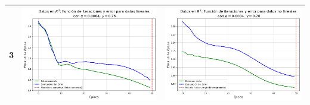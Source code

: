 \documentclass{article}
\begin{document}
\begin{table}[h!]
\begin{tabular}{|c|M{68mm}|M{68mm}|}
        3 & \includegraphics[width=\linewidth]{imgs/R2/Lineal_3.png} & \includegraphics[width=\linewidth]{imgs/R2/Nonlineal_3.png} \\
        \hline

\end{tabular}
\end{table}
\end{document}
